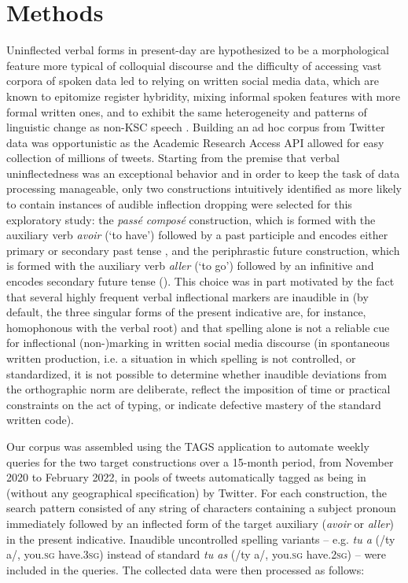 \documentclass[output=paper,colorlinks,citecolor=brown]{langscibook}
\begin{document}
\section{Methods} \label{09sec2}

Uninflected verbal forms in present-day  are hypothesized to be a morphological feature more typical of colloquial discourse and the difficulty of accessing vast corpora of spoken data led to relying on written social media data, which are known to epitomize register hybridity, mixing informal spoken features with more formal written ones, and to exhibit the same heterogeneity and patterns of linguistic change as non-KSC speech \citep{tagliamontedenis2008, bohmann2020}. Building an ad hoc corpus from Twitter data was opportunistic as the Academic Research Access API allowed for easy collection of millions of  tweets. Starting from the premise that verbal uninflectedness was an exceptional behavior and in order to keep the task of data processing manageable, only two constructions intuitively identified as more likely to contain instances of audible inflection dropping were selected for this exploratory study: the \emph{passé composé} construction, which is formed with the auxiliary verb \emph{avoir} (`to have') followed by a past participle and encodes either primary or secondary past tense \citep{mosegaardhansen2016}, and the periphrastic future construction, which is formed with the auxiliary verb \emph{aller} (`to go') followed by an infinitive and encodes secondary future tense (\citealt{mosegaardhansen2016}). This choice was in part motivated by the fact that several highly frequent verbal inflectional markers are inaudible in  (by default, the three singular forms of the present indicative are, for instance, homophonous with the verbal root) and that spelling alone is not a reliable cue for inflectional (non-)marking in written social media discourse (in spontaneous written production, i.e. a situation in which spelling is not controlled, or standardized, it is not possible to determine whether inaudible deviations from the orthographic norm are deliberate, reflect the imposition of time or practical constraints on the act of typing, or indicate defective mastery of the standard written code).

Our corpus was assembled using the TAGS application \citep{hawksey2016} to automate weekly queries for the two target constructions over a 15-month period, from November 2020 to February 2022, in pools of tweets automatically tagged as being in  (without any geographical specification) by Twitter. For each construction, the search pattern consisted of any string of characters containing a subject pronoun immediately followed by an inflected form of the target auxiliary (\emph{avoir} or \emph{aller}) in the present indicative. Inaudible uncontrolled spelling variants -- e.g. \emph{tu a} (/ty a/, you.\textsc{sg} have.\textsc{3sg}) instead of standard \emph{tu as} (/ty a/, you.\textsc{sg} have.\textsc{2sg}) -- were included in the queries. The collected data were then processed as follows:
\end{document}
